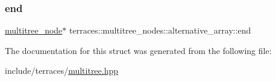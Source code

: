 \subsubsection{\texorpdfstring{end}{end}}
{\footnotesize\ttfamily \hyperlink{structterraces_1_1multitree__node}{multitree\+\_\+node}$\ast$ terraces\+::multitree\+\_\+nodes\+::alternative\+\_\+array\+::end}



The documentation for this struct was generated from the following file\+:\begin{DoxyCompactItemize}
\item 
include/terraces/\hyperlink{multitree_8hpp}{multitree.\+hpp}\end{DoxyCompactItemize}
